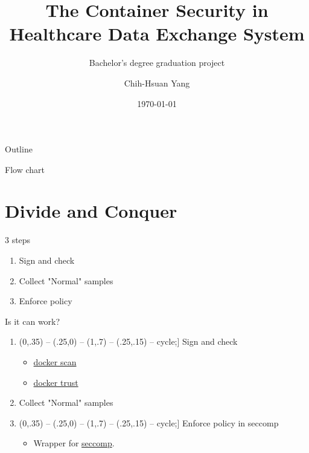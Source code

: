 \documentclass{beamer}
\title{The Container Security in Healthcare Data Exchange System}
\subtitle{Bachelor's degree graduation project}
\author{Chih-Hsuan Yang}
\institute{National Sun Yat-sen University\\
Advisor: Chun-I Fan
}
\date{\today}
\def\checkmark{\tikz\fill[scale=0.4](0,.35) -- (.25,0) -- (1,.7) -- (.25,.15) -- cycle;}
\begin{document}
\begin{CJK*}{UTF8}{bsmi}

  \begin{frame}
    \titlepage
  \end{frame}


  \begin{frame}{Outline}
    \begin{multicols}{2}
      \tableofcontents
    \end{multicols}
  \end{frame}

  \begin{frame}{Flow chart}
    \centering
    \scalebox{0.9} {
    }
  \end{frame}

  \section{Divide and Conquer}
  \begin{frame}{3 steps}
    \begin{enumerate}
      \item Sign and check
      \item Collect "Normal" samples
      \item Enforce policy
    \end{enumerate}
  \end{frame}

  \begin{frame}{Is it can work?}
    \begin{enumerate}
      \item[\checkmark] Sign and check
            \begin{itemize}
              \item \href{https://docs.docker.com/engine/scan/}{docker scan}
              \item \href{https://docs.docker.com/engine/reference/commandline/trust_signer_add/}{docker trust}
            \end{itemize}
      \item[?] Collect "Normal" samples
      \item[\checkmark] Enforce policy in seccomp
            \begin{itemize}
              \item Wrapper for \href{https://man7.org/linux/man-pages/man2/seccomp.2.html}{seccomp}.
            \end{itemize}
    \end{enumerate}
  \end{frame}


\end{CJK*}
\end{document}
